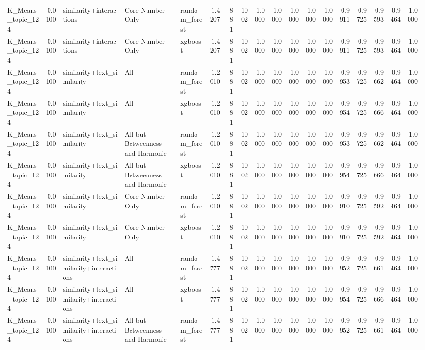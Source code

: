 \begin{tabular}{lrlllrrrrrrrrrrrrr}
K_Means_topic_124 & 0.0100 & similarity+interactions & Core Number Only & random_forest & 1.4207 & 881 & 1002 & 1.0000 & 1.0000 & 1.0000 & 1.0000 & 1.0000 & 0.9911 & 0.9725 & 0.9593 & 0.9464 & 1.0000 \\
K_Means_topic_124 & 0.0100 & similarity+interactions & Core Number Only & xgboost & 1.4207 & 881 & 1002 & 1.0000 & 1.0000 & 1.0000 & 1.0000 & 1.0000 & 0.9911 & 0.9725 & 0.9593 & 0.9464 & 1.0000 \\
K_Means_topic_124 & 0.0100 & similarity+text_similarity & All & random_forest & 1.2010 & 881 & 1002 & 1.0000 & 1.0000 & 1.0000 & 1.0000 & 1.0000 & 0.9953 & 0.9725 & 0.9662 & 0.9464 & 1.0000 \\
K_Means_topic_124 & 0.0100 & similarity+text_similarity & All & xgboost & 1.2010 & 881 & 1002 & 1.0000 & 1.0000 & 1.0000 & 1.0000 & 1.0000 & 0.9954 & 0.9725 & 0.9666 & 0.9464 & 1.0000 \\
K_Means_topic_124 & 0.0100 & similarity+text_similarity & All but Betweenness and Harmonic & random_forest & 1.2010 & 881 & 1002 & 1.0000 & 1.0000 & 1.0000 & 1.0000 & 1.0000 & 0.9953 & 0.9725 & 0.9662 & 0.9464 & 1.0000 \\
K_Means_topic_124 & 0.0100 & similarity+text_similarity & All but Betweenness and Harmonic & xgboost & 1.2010 & 881 & 1002 & 1.0000 & 1.0000 & 1.0000 & 1.0000 & 1.0000 & 0.9954 & 0.9725 & 0.9666 & 0.9464 & 1.0000 \\
K_Means_topic_124 & 0.0100 & similarity+text_similarity & Core Number Only & random_forest & 1.2010 & 881 & 1002 & 1.0000 & 1.0000 & 1.0000 & 1.0000 & 1.0000 & 0.9910 & 0.9725 & 0.9592 & 0.9464 & 1.0000 \\
K_Means_topic_124 & 0.0100 & similarity+text_similarity & Core Number Only & xgboost & 1.2010 & 881 & 1002 & 1.0000 & 1.0000 & 1.0000 & 1.0000 & 1.0000 & 0.9910 & 0.9725 & 0.9592 & 0.9464 & 1.0000 \\
K_Means_topic_124 & 0.0100 & similarity+text_similarity+interactions & All & random_forest & 1.4777 & 881 & 1002 & 1.0000 & 1.0000 & 1.0000 & 1.0000 & 1.0000 & 0.9952 & 0.9725 & 0.9661 & 0.9464 & 1.0000 \\
K_Means_topic_124 & 0.0100 & similarity+text_similarity+interactions & All & xgboost & 1.4777 & 881 & 1002 & 1.0000 & 1.0000 & 1.0000 & 1.0000 & 1.0000 & 0.9954 & 0.9725 & 0.9666 & 0.9464 & 1.0000 \\
K_Means_topic_124 & 0.0100 & similarity+text_similarity+interactions & All but Betweenness and Harmonic & random_forest & 1.4777 & 881 & 1002 & 1.0000 & 1.0000 & 1.0000 & 1.0000 & 1.0000 & 0.9952 & 0.9725 & 0.9661 & 0.9464 & 1.0000 \\

\end{tabular}

